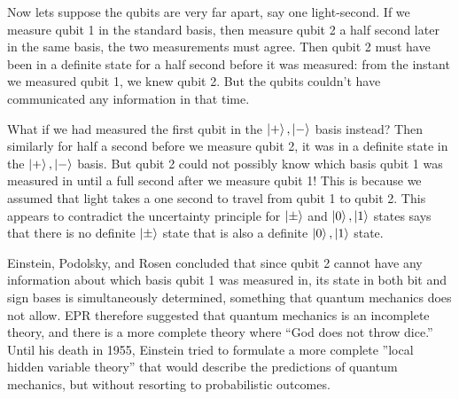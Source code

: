 Now lets suppose the qubits are very far apart, say one light-second. If we measure qubit 1 in the standard basis, then measure qubit 2 a half second later in the same basis, the two measurements must agree. Then qubit 2 must have been in a definite state for a half second before it was measured: from the instant we measured qubit 1, we knew qubit 2. But the qubits couldn’t have communicated any information in that time. 

What if we had measured the first qubit in the $\ket{+},\ket{-}$ basis instead? Then similarly for half a second before we measure qubit 2, it was in a definite state in the $\ket{+},\ket{-}$ basis. But qubit 2 could not possibly know which basis qubit 1 was measured in until a full second after we measure qubit 1! This is because we assumed that light takes a one second to travel from qubit 1 to qubit 2. This appears to contradict the uncertainty principle for $\ket{\pm}$ and $\ket{0},\ket{1}$ states says that there is no definite $\ket{\pm}$ state that is also a definite $\ket{0},\ket{1}$ state.

Einstein, Podolsky, and Rosen concluded that since qubit 2 cannot have any information about which basis qubit 1 was measured in, its state in both bit and sign bases is simultaneously determined, something that quantum mechanics does not allow. EPR therefore suggested that quantum mechanics is an incomplete theory, and there is a more complete theory where ``God does not throw dice.” Until his death in 1955, Einstein tried to formulate a more complete ”local hidden variable theory” that would describe the predictions of quantum mechanics, but without resorting to probabilistic outcomes.

